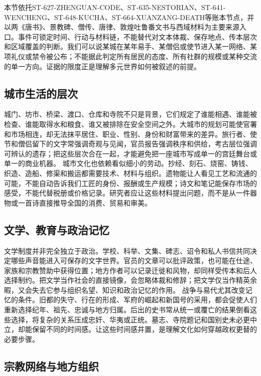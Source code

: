 本节依托ST-627-ZHENGUAN-CODE、ST-635-NESTORIAN、ST-641-WENCHENG、ST-648-KUCHA、ST-664-XUANZANG-DEATH等账本节点，并以两《唐书》、景教碑、僧传、唐律、敦煌吐鲁番文书与西域材料为主要来源入口。事件可锁定时间、行动与材料链，不能替代对文本体裁、保存地点、传本层次和区域覆盖的判断。我们可以说某城在某年易手、某僧侣或使节进入某一网络、某项礼仪或禁令被公布；不能据此判定所有居民的态度、所有社群的规模或某种交流的单一方向。证据的限度正是理解多元世界如何被叙述的前提。  \subsection{城市生活的层次} 城门、坊市、桥梁、渡口、仓库和寺院不只是背景，它们规定了谁能相遇、谁能被检查、谁能取得水和粮食、谁又被排除在安全空间之外。大城市的规划可能使官署和市场相连，却无法抹平居住、职业、性别、身份和财富带来的差异。旅行者、使节和僧侣留下的文字常强调奇观与见闻，官员报告强调秩序和供给，考古层位强调可辨认的遗存；把这些层次合在一起，才能避免把一座城市写成单一的宫廷舞台或单一的商业机器。  城市文化也依赖看似细小的劳动。抄经、刻石、烧窑、铸钱、织造、造船、修渠和搬运都需要技术、材料与组织。遗物能让人看见工艺和流通的可能，不能自动告诉我们工匠的身份、报酬或生产规模；诗文和笔记能保存市场的感受，不能代替税册或价格记录。研究者应让这些材料提出问题，而不是从一件器物或一首诗直接推导全国的消费、贸易和审美。  \subsection{文学、教育与政治记忆} 文学制度并非完全独立于政治。学校、科举、文集、碑志、诏令和私人书信共同决定哪些声音能进入可保存的文字世界。官员的文章可以批评政策，也可能在仕途、家族和宗教赞助中获得位置；地方作者可以记录迁徙和风物，却同样受传本和后人选择制约。把文学当作社会的直接镜像，会忽略体裁和修辞；把文学仅当作精英余暇，又会失去它参与组织名望、知识和政治记忆的作用。  战争与易代尤其改变记忆的条件。旧都的失守、行在的形成、军府的崛起和新国号的采用，都会促使人们重新选择纪年、祖先、忠诚与地方归属。后出的史书常从统一或覆亡的结果倒看这些选择，将复杂的关系压成忠奸、华夷或正统。墓志、寺院题记和国别史未必更中立，却能保留不同的时间感。让这些时间感并置，是理解文化如何穿越政权更替的必要步骤。  \subsection{宗教网络与地方组织} 
